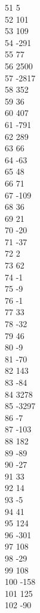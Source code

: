 { 51	5 \\
 52	101 \\
 53	109 \\
 54	-291 \\
 55	77 \\
 56	2500 \\
 57	-2817 \\
 58	352 \\
 59	36 \\
 60	407 \\
 61	-791 \\
 62	289 \\
 63	66 \\
 64	-63 \\
 65	48 \\
 66	71 \\
 67	-109 \\
 68	36 \\
 69	21 \\
 70	-20 \\
 71	-37 \\
 72	2 \\
 73	62 \\
 74	-1 \\
 75	-9 \\
 76	-1 \\
 77	33 \\
 78	-32 \\
 79	46 \\
 80	-9 \\
 81	-70 \\
 82	143 \\
 83	-84 \\
 84	3278 \\
 85	-3297 \\
 86	-7 \\
 87	-103 \\
 88	182 \\
 89	-89 \\
 90	-27 \\
 91	33 \\
 92	14 \\
 93	-5 \\
 94	41 \\
 95	124 \\
 96	-301 \\
 97	108 \\
 98	-29 \\
 99	108 \\
 100	-158 \\
 101	125 \\
 102	-90 \\
}
